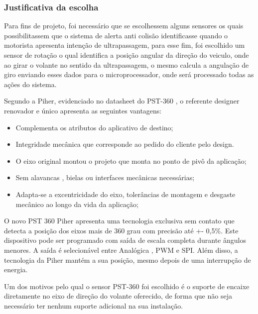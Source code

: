 \subsubsection{Justificativa da escolha}
Para fins de projeto, foi necessário que se escolhessem alguns sensores os quais
possibilitassem que o sistema de alerta anti colisão identificasse quando o motorista
apresenta intenção de ultrapassagem, para esse fim, foi escolhido um sensor de rotação o
 qual identifica a posição angular da direção do veiculo, onde ao girar o volante no
 sentido da ultrapassagem, o mesmo calcula a angulação de giro enviando esses
 dados para o microprocessador, onde será processado todas as ações do sistema.

Segundo a Piher, evidenciado no datasheet do PST-360 \cite{sensor_rotacao}, o referente designer
renovador e único apresenta as seguintes vantagens:

\begin{itemize}
  \item Complementa os atributos do aplicativo de destino;
  \item Integridade mecânica que corresponde ao pedido do cliente pelo design.
  \item O eixo original montou o projeto que monta no ponto de pivô da aplicação;

  \item Sem alavancas , bielas ou interfaces mecânicas necessárias;

  \item Adapta-se a excentricidade do eixo, tolerâncias de montagem e
  desgaste mecânico ao longo da vida da aplicação;

\end{itemize}

O novo PST 360 Piher apresenta uma tecnologia exclusiva sem contato que detecta a posição dos
eixos mais de 360 grau com precisão até +- 0,5\%. Este dispositivo pode ser programado com
saída de escala completa durante ângulos menores. A saída é selecionável entre Analógica ,
PWM e SPI. Além disso, a tecnologia da Piher mantém a sua posição, mesmo depois de uma
interrupção de energia.

Um dos motivos pelo qual o sensor PST-360 foi escolhido é o suporte de encaixe
diretamente no eixo de direção do volante oferecido, de forma que não seja
necessário ter nenhum suporte adicional na sua instalação.

